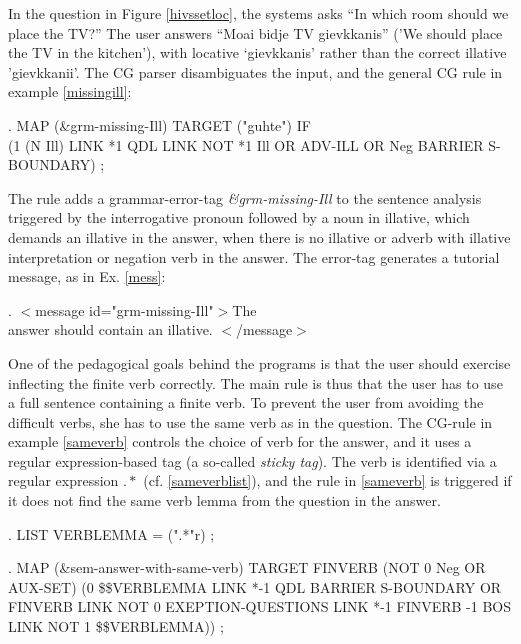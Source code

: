\documentclass[11pt]{article}
\begin{document}
In the question in Figure \ref{hivssetloc}, the systems asks “In which room should we place the TV?” The user answers “Moai bidje TV gievkkanis” ('We should place the TV in the kitchen'), with locative ‘gievkkanis’ rather than the correct illative 'gievkkanii'. The CG parser disambiguates the input, and the general CG rule in example \ref{missingill}: 

\ex.\flushleft\label{missingill} \small{MAP (\&grm-missing-Ill) TARGET ("guhte") IF \\(1 (N Ill) LINK *1 QDL LINK NOT *1 Ill OR ADV-ILL OR Neg BARRIER S-BOUNDARY) ;}

The rule adds a grammar-error-tag \textit{\&grm-missing-Ill} to the sentence analysis triggered by the interrogative pronoun followed by a noun in illative, which demands an illative in the answer, when there is no illative or adverb with illative interpretation or negation verb in the answer. The error-tag generates a tutorial message, as in Ex. \ref{mess}:  

\ex.\label{mess} \small{$<$message id="grm-missing-Ill"$>$The \\answer should contain an illative. $<$/message$>$}


One of the pedagogical goals behind the programs is that the user should exercise inflecting the finite verb correctly. The main rule is thus that the user has to use a full sentence containing a finite verb. To prevent the user from avoiding the difficult verbs, she has to use the same verb as in the question. The CG-rule in example \ref{sameverb} controls the choice of verb for the answer, and it uses a regular expression-based tag (a so-called \textit{sticky tag}). The verb is identified via a regular expression $.*$ (cf. \ref{sameverblist}), and the rule in \ref{sameverb} is triggered if it does not find the same verb lemma from the question in the answer.

\ex.\flushleft\label{sameverblist} \small{LIST VERBLEMMA = (".*"r) ;}

\ex.\flushleft\label{sameverb} \small{MAP (\&sem-answer-with-same-verb) TARGET FINVERB (NOT 0 Neg OR AUX-SET) (0 \$\$VERBLEMMA LINK *-1 QDL BARRIER S-BOUNDARY OR FINVERB LINK NOT 0 EXEPTION-QUESTIONS LINK *-1 FINVERB -1 BOS LINK NOT 1 \$\$VERBLEMMA)) ;}
\end{document}
